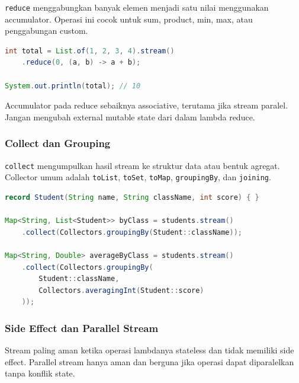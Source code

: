 \begin{jawab}
\texttt{reduce} menggabungkan banyak elemen menjadi satu nilai menggunakan accumulator. Operasi ini cocok untuk sum, product, min, max, atau penggabungan custom.
\end{jawab}

\begin{lstlisting}[language=Java, caption={Reduce untuk menjumlahkan nilai}, label={lst:stream-reduce}]
int total = List.of(1, 2, 3, 4).stream()
    .reduce(0, (a, b) -> a + b);

System.out.println(total); // 10
\end{lstlisting}

Accumulator pada reduce sebaiknya associative, terutama jika stream paralel. Jangan mengubah external mutable state dari dalam lambda reduce.

\subsubsection{Collect dan Grouping}

\begin{jawab}
\texttt{collect} mengumpulkan hasil stream ke struktur data atau bentuk agregat. Collector umum adalah \texttt{toList}, \texttt{toSet}, \texttt{toMap}, \texttt{groupingBy}, dan \texttt{joining}.
\end{jawab}

\begin{lstlisting}[language=Java, caption={Grouping dengan Collectors}, label={lst:stream-grouping}]
record Student(String name, String className, int score) { }

Map<String, List<Student>> byClass = students.stream()
    .collect(Collectors.groupingBy(Student::className));

Map<String, Double> averageByClass = students.stream()
    .collect(Collectors.groupingBy(
        Student::className,
        Collectors.averagingInt(Student::score)
    ));
\end{lstlisting}

\subsubsection{Side Effect dan Parallel Stream}

\begin{jawab}
Stream paling aman ketika operasi lambdanya stateless dan tidak memiliki side effect. Parallel stream hanya aman dan berguna jika operasi dapat diparalelkan tanpa konflik state.
\end{jawab}

